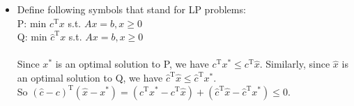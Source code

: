 \documentclass{article}
\begin{document}
	\begin{itemize}
		\item [2. a)]
		Define following symbols that stand for LP problems:\\
		P: min $c^\mathrm{T}x$ s.t. $Ax=b,x\geq0$\\
		Q: min $\hat{c}^\mathrm{T}x$ s.t. $Ax=b,x\geq0$\\ \\
		
		Since $x^*$ is an optimal solution to P, we have $c^\mathrm{T}x^* \leq c^\mathrm{T}\hat{x}$. Similarly, since $\hat{x}$ is an optimal solution to Q, we have $\hat{c}^\mathrm{T}\hat{x} \leq \hat{c}^\mathrm{T}x^*$.\\
		So $(\hat{c}-c)^\mathrm{T}(\hat{x}-x^*)=(c^\mathrm{T}x^*-c^\mathrm{T}\hat{x})+(\hat{c}^\mathrm{T}\hat{x}-\hat{c}^\mathrm{T}x^*)\leq 0.$
	\end{itemize}
\end{document}
